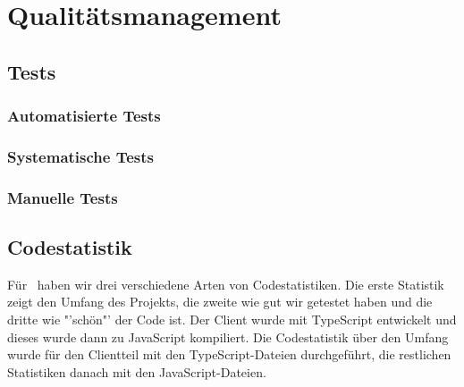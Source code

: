 \chapter{Qualitätsmanagement}

\section{Tests}
	\subsection{Automatisierte Tests}
	
	
	\subsection{Systematische Tests}
	
	
	\subsection{Manuelle Tests}


\section{Codestatistik}
	Für \eeppi\ haben wir drei verschiedene Arten von Codestatistiken.
	Die erste Statistik zeigt den Umfang des Projekts,
	die zweite wie gut wir getestet haben
	und die dritte wie "'schön"' der Code ist.
	Der Client wurde mit TypeScript entwickelt und dieses wurde dann zu JavaScript kompiliert.
	Die Codestatistik über den Umfang wurde für den Clientteil mit den TypeScript-Dateien durchgeführt,
	die restlichen Statistiken danach mit den JavaScript-Dateien.
	
